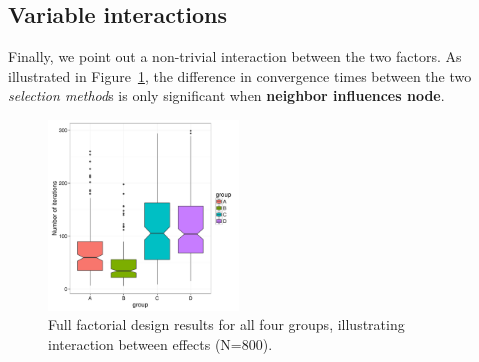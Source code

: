 \subsection{Variable interactions}

Finally, we point out a non-trivial interaction between the two factors. As
illustrated in Figure~\ref{interactionBoxplot}, the difference in convergence
times between the two \textsl{selection method}s is only significant when
\textbf{neighbor influences node}.

\begin{figure}[ht]
\centering
\includegraphics[width=0.45\textwidth]{interactionBoxplot.pdf} 
\caption{Full factorial design results for all four groups, illustrating
interaction between effects (N=800).}
\label{interactionBoxplot}
\end{figure}


